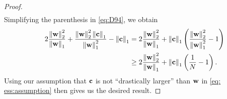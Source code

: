 \begin{proof}
\begin{align}
    \end{align}
    Simplifying the parenthesis in \eqref{eq:D94}, we obtain
    \begin{align}
        \mathrel{\phantom{=}} 2 \frac{ \left\lVert {\bf w} \right\rVert_2^2 }{ \left\lVert {\bf w} \right\rVert_1 } + \frac{ \left\lVert {\bf w} \right\rVert_2^2 \left\lVert {\bf c} \right\rVert_1 }{ \left\lVert {\bf w} \right\rVert_1^2 } - \left\lVert{\bf c}\right\rVert_1 &= 2 \frac{ \left\lVert {\bf w} \right\rVert_2^2 }{ \left\lVert {\bf w} \right\rVert_1 } + \left\lVert{\bf c}\right\rVert_1 \left( \frac{ \left\lVert {\bf w} \right\rVert_2^2 }{ \left\lVert {\bf w} \right\rVert_1^2 } - 1 \right) \\
        &\geq 2 \frac{ \left\lVert {\bf w} \right\rVert_2^2 }{ \left\lVert {\bf w} \right\rVert_1 } + \left\lVert{\bf c}\right\rVert_1 \left( \frac{1}{N} - 1 \right).
    \end{align}
    Using our assumption that ${\bf c}$ is not ``drastically larger'' than ${\bf w}$ in \eqref{eq: ess:assumption} then gives us the desired result.
\end{proof}